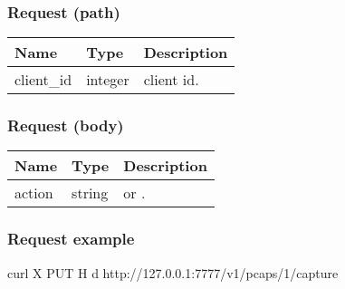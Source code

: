 \documentclass[a4paper,11pt,openany,oneside,english]{sphinxmanual}
\begin{document}
\subsubsection{Request (path)}
\label{\detokenize{api_ref/spp_pcap:id1}}

\begin{savenotes}\sphinxattablestart
\centering
{}
\sphinxthecaptionisattop
{}\label{\detokenize{api_ref/spp_pcap:id13}}\label{\detokenize{api_ref/spp_pcap:table-spp-ctl-spp-pcap-capture}}
\sphinxaftertopcaption
\begin{tabulary}{\linewidth}[t]{|T|T|T|}
\hline
\sphinxstyletheadfamily 
Name
&\sphinxstyletheadfamily 
Type
&\sphinxstyletheadfamily 
Description
\\
\hline
client\_id
&
integer
&
client id.
\\
\hline
\end{tabulary}
\par
\sphinxattableend\end{savenotes}


\subsubsection{Request (body)}
\label{\detokenize{api_ref/spp_pcap:request-body}}

\begin{savenotes}\sphinxattablestart
\centering
{}
\sphinxthecaptionisattop
{}\label{\detokenize{api_ref/spp_pcap:id14}}\label{\detokenize{api_ref/spp_pcap:table-spp-ctl-spp-pcap-capture-body}}
\sphinxaftertopcaption
\begin{tabulary}{\linewidth}[t]{|T|T|T|}
\hline
\sphinxstyletheadfamily 
Name
&\sphinxstyletheadfamily 
Type
&\sphinxstyletheadfamily 
Description
\\
\hline
action
&
string
&
 or .
\\
\hline
\end{tabulary}
\par
\sphinxattableend\end{savenotes}


\subsubsection{Request example}
\label{\detokenize{api_ref/spp_pcap:id2}}
\begin{sphinxVerbatim}[commandchars=\\\{\},formatcom=\footnotesize]
 curl \PYGZhy{}X PUT \PYGZhy{}H  
  \PYGZhy{}d  
  http://127.0.0.1:7777/v1/pcaps/1/capture
\end{sphinxVerbatim}
\end{document}
